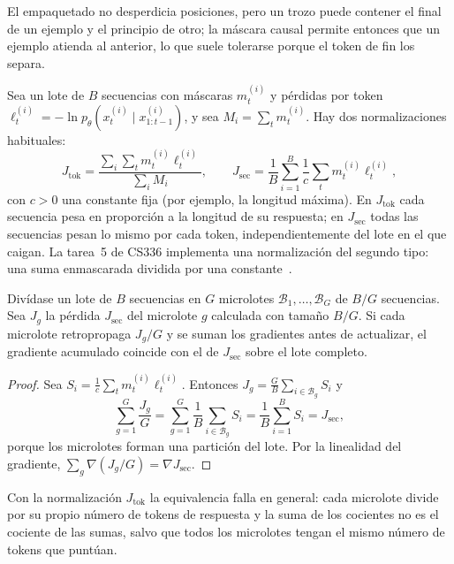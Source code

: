 El empaquetado no desperdicia posiciones, pero un trozo puede contener el final de un ejemplo y el principio de otro; la máscara causal permite entonces que un ejemplo atienda al anterior, lo que suele tolerarse porque el token de fin los separa.

Sea un lote de $B$ secuencias con máscaras $m^{(i)}_t$ y pérdidas por token $\ell^{(i)}_t=-\ln p_\theta(x^{(i)}_t\mid x^{(i)}_{1:t-1})$, y sea $M_i=\sum_t m^{(i)}_t$. Hay dos normalizaciones habituales:
\[
J_{\mathrm{tok}}=\frac{\sum_{i}\sum_t m^{(i)}_t\ell^{(i)}_t}{\sum_i M_i},\qquad
J_{\mathrm{sec}}=\frac{1}{B}\sum_{i=1}^{B}\frac{1}{c}\sum_t m^{(i)}_t\ell^{(i)}_t,
\]
con $c>0$ una constante fija (por ejemplo, la longitud máxima). En $J_{\mathrm{tok}}$ cada secuencia pesa en proporción a la longitud de su respuesta; en $J_{\mathrm{sec}}$ todas las secuencias pesan lo mismo por cada token, independientemente del lote en el que caigan. La tarea~5 de CS336 implementa una normalización del segundo tipo: una suma enmascarada dividida por una constante~\cite[§4.2]{cs336a5}.

\begin{proposicion}\label{prop:acumulacion}
Divídase un lote de $B$ secuencias en $G$ microlotes $\mathcal{B}_1,\dots,\mathcal{B}_G$ de $B/G$ secuencias. Sea $J_g$ la pérdida $J_{\mathrm{sec}}$ del microlote $g$ calculada con tamaño $B/G$. Si cada microlote retropropaga $J_g/G$ y se suman los gradientes antes de actualizar, el gradiente acumulado coincide con el de $J_{\mathrm{sec}}$ sobre el lote completo.
\end{proposicion}

\begin{proof}
Sea $S_i=\frac1c\sum_t m^{(i)}_t\ell^{(i)}_t$. Entonces $J_g=\frac{G}{B}\sum_{i\in\mathcal{B}_g}S_i$ y
\[
\sum_{g=1}^{G}\frac{J_g}{G}=\sum_{g=1}^{G}\frac{1}{B}\sum_{i\in\mathcal{B}_g}S_i=\frac{1}{B}\sum_{i=1}^{B}S_i=J_{\mathrm{sec}},
\]
porque los microlotes forman una partición del lote. Por la linealidad del gradiente, $\sum_g\nabla(J_g/G)=\nabla J_{\mathrm{sec}}$.
\end{proof}

\begin{observacion}
Con la normalización $J_{\mathrm{tok}}$ la equivalencia falla en general: cada microlote divide por su propio número de tokens de respuesta y la suma de los cocientes no es el cociente de las sumas, salvo que todos los microlotes tengan el mismo número de tokens que puntúan.
\end{observacion}

